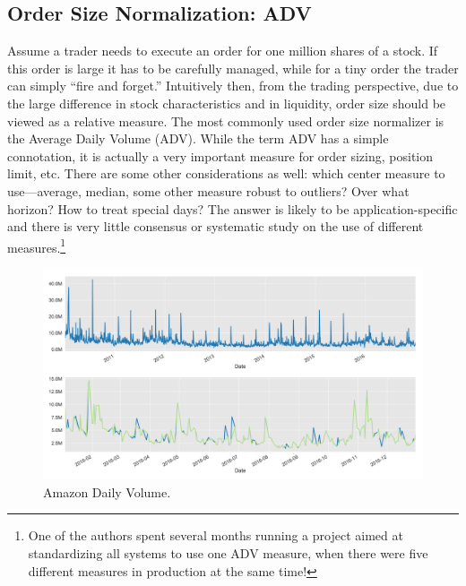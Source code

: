 \subsection{Order Size Normalization: ADV\label{sec:order_size_norm_adv}}

Assume a trader needs to execute an order for one million shares of a stock. If this order is large it has to be carefully managed, while for a tiny order the trader can simply ``fire and forget.''  Intuitively then, from the trading perspective, due to  the large difference in stock characteristics and in liquidity, order size should be viewed as a relative measure. The most commonly used order size normalizer is the Average Daily Volume (ADV). While the term ADV has a simple connotation, it is actually a very important measure for order sizing, position limit, etc. There are some other considerations as well: which center measure to use---average, median, some other measure robust to outliers? Over what horizon? How to treat special days? The answer is likely to be application-specific and there is very little consensus or systematic study on the use of different measures.\footnote{One of the authors spent several months running a project aimed at standardizing all systems to use one ADV measure, when there were five different measures in production at the same time!}
 	
	\begin{figure}[!ht]
	\centering
	\includegraphics[width=\textwidth]{chapters/chapter_trade_data_models/figures/daily_volume.png} 
	\caption{Amazon Daily Volume.\label{fig:daily_volume}}
	\end{figure}


